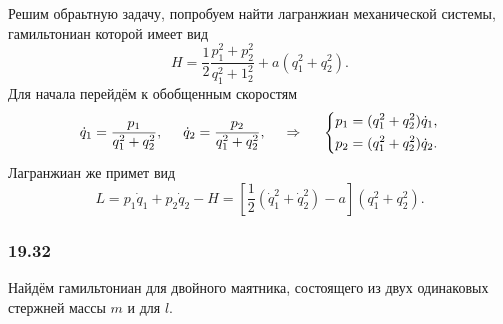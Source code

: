 Решим обраьтную задачу, попробуем найти лагранжиан механической системы, гамильтониан которой имеет вид
\begin{equation*}
    H = \frac{1}{2} \frac{p_1^2 + p_2^2}{q_1^2 + 1_2^2} + a(q_1^2 + q_2^2).
\end{equation*} 
Для начала перейдём к обобщенным скоростям
\begin{equation*}
    \dot{q}_1 = \frac{p_1}{q_1^2+q_2^2},
    \hspace{5 mm} 
    \dot{q}_2 = \frac{p_2}{q_1^2+q_2^2},
    \hspace{0.5cm} \Rightarrow \hspace{0.5cm}
    \left\{\begin{aligned}
        p_1 &= (q_1^2+q_2^2) \dot{q}_1, \\
        p_2 &= (q_1^2+q_2^2) \dot{q}_2.
    \end{aligned}\right.
\end{equation*}
Лагранжиан же примет вид
\begin{equation*}
    L = p_1 \dot{q}_1 + p_2 \dot{q}_2 - H = 
    \left[
        \frac{1}{2} \left(
            \dot{q}_1^2 + \dot{q}_2^2
        \right) - a
    \right] (q_1^2 + q_2^2).
\end{equation*}


\subsubsection*{19.32}

Найдём гамильтониан для двойного маятника, состоящего из двух одинаковых стержней массы $m$ и для $l$. 

